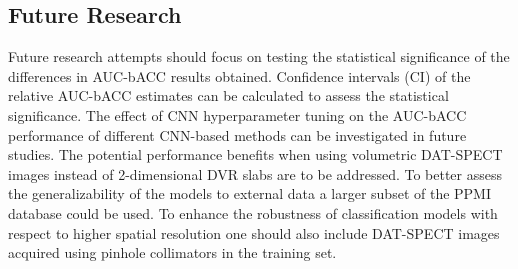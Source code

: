 \subsection{Future Research}

Future research attempts should focus on testing the statistical significance of 
the differences in AUC-bACC results obtained.
Confidence intervals (CI) of the relative AUC-bACC estimates can be calculated to assess the statistical significance.
The effect of CNN hyperparameter tuning on the AUC-bACC performance of different CNN-based methods 
can be investigated in future studies.
The potential performance benefits when using volumetric DAT-SPECT images instead of 2-dimensional DVR slabs 
are to be addressed.
To better assess the generalizability of the models to external data a larger subset of the PPMI database could be used.
To enhance the robustness of classification models with respect to higher spatial resolution 
one should also include DAT-SPECT images acquired using pinhole collimators in the training set.









